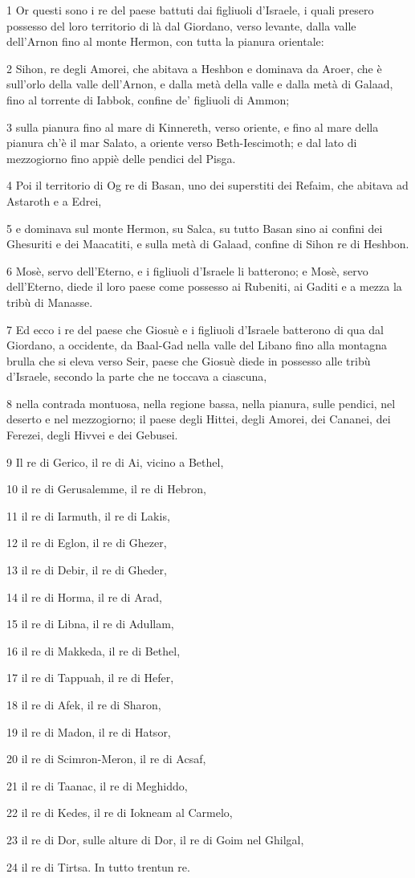 \par 1 Or questi sono i re del paese battuti dai figliuoli d'Israele, i quali presero possesso del loro territorio di là dal Giordano, verso levante, dalla valle dell'Arnon fino al monte Hermon, con tutta la pianura orientale:
\par 2 Sihon, re degli Amorei, che abitava a Heshbon e dominava da Aroer, che è sull'orlo della valle dell'Arnon, e dalla metà della valle e dalla metà di Galaad, fino al torrente di Iabbok, confine de' figliuoli di Ammon;
\par 3 sulla pianura fino al mare di Kinnereth, verso oriente, e fino al mare della pianura ch'è il mar Salato, a oriente verso Beth-Iescimoth; e dal lato di mezzogiorno fino appiè delle pendici del Pisga.
\par 4 Poi il territorio di Og re di Basan, uno dei superstiti dei Refaim, che abitava ad Astaroth e a Edrei,
\par 5 e dominava sul monte Hermon, su Salca, su tutto Basan sino ai confini dei Ghesuriti e dei Maacatiti, e sulla metà di Galaad, confine di Sihon re di Heshbon.
\par 6 Mosè, servo dell'Eterno, e i figliuoli d'Israele li batterono; e Mosè, servo dell'Eterno, diede il loro paese come possesso ai Rubeniti, ai Gaditi e a mezza la tribù di Manasse.
\par 7 Ed ecco i re del paese che Giosuè e i figliuoli d'Israele batterono di qua dal Giordano, a occidente, da Baal-Gad nella valle del Libano fino alla montagna brulla che si eleva verso Seir, paese che Giosuè diede in possesso alle tribù d'Israele, secondo la parte che ne toccava a ciascuna,
\par 8 nella contrada montuosa, nella regione bassa, nella pianura, sulle pendici, nel deserto e nel mezzogiorno; il paese degli Hittei, degli Amorei, dei Cananei, dei Ferezei, degli Hivvei e dei Gebusei.
\par 9 Il re di Gerico, il re di Ai, vicino a Bethel,
\par 10 il re di Gerusalemme, il re di Hebron,
\par 11 il re di Iarmuth, il re di Lakis,
\par 12 il re di Eglon, il re di Ghezer,
\par 13 il re di Debir, il re di Gheder,
\par 14 il re di Horma, il re di Arad,
\par 15 il re di Libna, il re di Adullam,
\par 16 il re di Makkeda, il re di Bethel,
\par 17 il re di Tappuah, il re di Hefer,
\par 18 il re di Afek, il re di Sharon,
\par 19 il re di Madon, il re di Hatsor,
\par 20 il re di Scimron-Meron, il re di Acsaf,
\par 21 il re di Taanac, il re di Meghiddo,
\par 22 il re di Kedes, il re di Iokneam al Carmelo,
\par 23 il re di Dor, sulle alture di Dor, il re di Goim nel Ghilgal,
\par 24 il re di Tirtsa. In tutto trentun re.


